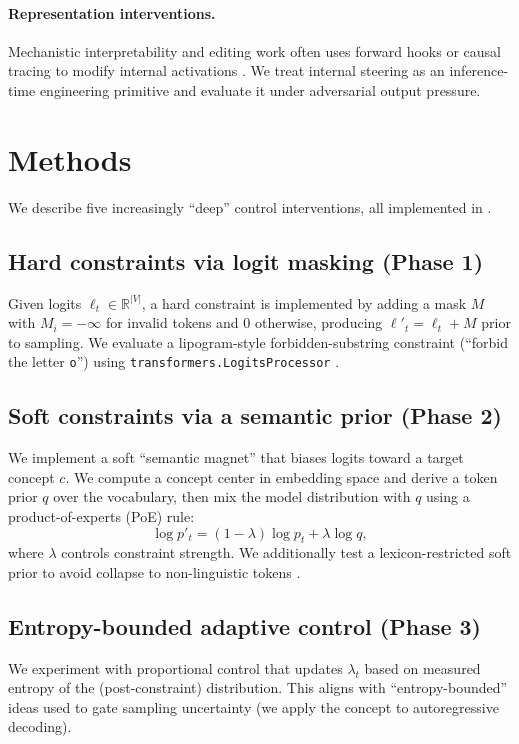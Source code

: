 \documentclass{article}
\begin{document}
\paragraph{Representation interventions.}
Mechanistic interpretability and editing work often uses forward hooks or causal tracing to modify internal activations \citep{meng2022rome}.
We treat internal steering as an inference-time engineering primitive and evaluate it under adversarial output pressure.

\section{Methods}

We describe five increasingly ``deep'' control interventions, all implemented in \citep{thiswork2026}.

\subsection{Hard constraints via logit masking (Phase 1)}
Given logits $\ell_t \in \mathbb{R}^{|V|}$, a hard constraint is implemented by adding a mask $M$ with $M_i=-\infty$ for invalid tokens and $0$ otherwise, producing $\ell'_t=\ell_t+M$ prior to sampling.
We evaluate a lipogram-style forbidden-substring constraint (``forbid the letter \texttt{o}'') using \texttt{transformers.LogitsProcessor} \citep{wolf2020transformers}.

\subsection{Soft constraints via a semantic prior (Phase 2)}
We implement a soft ``semantic magnet'' that biases logits toward a target concept $c$.
We compute a concept center in embedding space and derive a token prior $q$ over the vocabulary, then mix the model distribution with $q$ using a product-of-experts (PoE) rule:
\[
\log p'_t = (1-\lambda)\log p_t + \lambda \log q,
\]
where $\lambda$ controls constraint strength.
We additionally test a lexicon-restricted soft prior to avoid collapse to non-linguistic tokens \citep{thiswork2026}.

\subsection{Entropy-bounded adaptive control (Phase 3)}
We experiment with proportional control that updates $\lambda_t$ based on measured entropy of the (post-constraint) distribution.
This aligns with ``entropy-bounded'' ideas used to gate sampling uncertainty \citep{entropybounded2024} (we apply the concept to autoregressive decoding).
\end{document}
